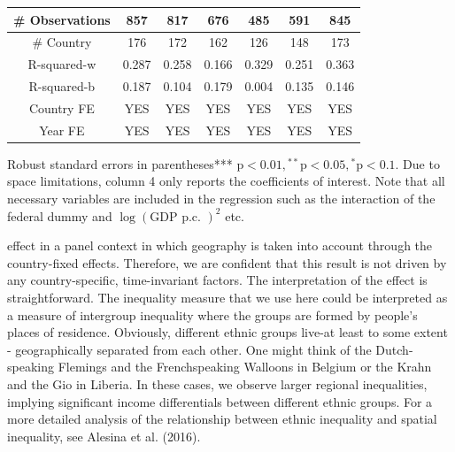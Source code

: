 \documentclass[10pt]{article}
\begin{document}
\begin{center}
\begin{tabular}{|c|c|c|c|c|c|c|}
\hline
\# Observations & 857 & 817 & 676 & 485 & 591 & 845 \\
\hline
\# Country & 176 & 172 & 162 & 126 & 148 & 173 \\
\hline
R-squared-w & 0.287 & 0.258 & 0.166 & 0.329 & 0.251 & 0.363 \\
\hline
R-squared-b & 0.187 & 0.104 & 0.179 & 0.004 & 0.135 & 0.146 \\
\hline
Country FE & YES & YES & YES & YES & YES & YES \\
\hline
Year FE & YES & YES & YES & YES & YES & YES \\
\hline
\end{tabular}
\end{center}

Robust standard errors in parentheses*** $\mathrm{p}<0.01,{ }^{* *} \mathrm{p}<0.05,{ }^{*} \mathrm{p}<0.1$. Due to space limitations, column 4 only reports the coefficients of interest. Note that all necessary variables are included in the regression such as the interaction of the federal dummy and $\log (\mathrm{GDP} \text { p.c. })^{2}$ etc.

effect in a panel context in which geography is taken into account through the country-fixed effects. Therefore, we are confident that this result is not driven by any country-specific, time-invariant factors. The interpretation of the effect is straightforward. The inequality measure that we use here could be interpreted as a measure of intergroup inequality where the groups are formed by people's places of residence. Obviously, different ethnic groups live-at least to some extent - geographically separated from each other. One might think of the Dutch-speaking Flemings and the Frenchspeaking Walloons in Belgium or the Krahn and the Gio in Liberia. In these cases, we observe larger regional inequalities, implying significant income differentials between different ethnic groups. For a more detailed analysis of the relationship between ethnic inequality and spatial inequality, see Alesina et al. (2016).
\end{document}
